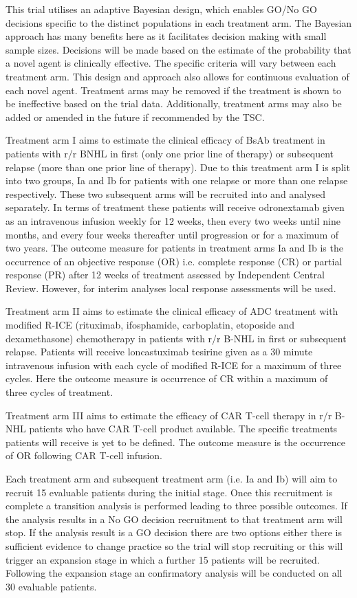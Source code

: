 This trial utilises an adaptive Bayesian design, which enables GO/No GO decisions specific to the distinct populations in each treatment arm. The Bayesian approach has many benefits here as it facilitates decision making with small sample sizes. Decisions will be made based on the estimate of the probability that a novel agent is clinically effective. The specific criteria will vary between each treatment arm. This design and approach also allows for continuous evaluation of each novel agent. Treatment arms may be removed if the treatment is shown to be ineffective based on the trial data. Additionally, treatment arms may also be added or amended in the future if recommended by the TSC. 

Treatment arm \RN{1} aims to estimate the clinical efficacy of BsAb treatment in patients with r/r BNHL in first (only one prior line of therapy) or subsequent relapse (more than one prior line of therapy). Due to this treatment arm \RN{1} is split into two groups, \RN{1}a and \RN{1}b for patients with one relapse or more than one relapse respectively. These two subsequent arms will be recruited into and analysed separately. In terms of treatment these patients will receive odronextamab given as an intravenous infusion weekly for 12 weeks, then every two weeks until nine months, and every four weeks thereafter until progression or for a maximum of two years. The outcome measure for patients in treatment arms \RN{1}a and \RN{1}b is the occurrence of an objective response (OR) i.e. complete response (CR) or partial response (PR) after 12 weeks of treatment assessed by Independent Central Review. However, for interim analyses local response assessments will be used. 

Treatment arm \RN{2} aims to estimate the clinical efficacy of ADC treatment with modified R-ICE (rituximab, ifosphamide, carboplatin, etoposide and dexamethasone) chemotherapy in patients with r/r B-NHL in first or subsequent relapse. Patients will receive loncastuximab tesirine given as a 30 minute intravenous infusion with each cycle of modified R-ICE for a maximum of three cycles. Here the outcome measure is occurrence of CR within a maximum of three cycles of treatment. 

Treatment arm \RN{3} aims to estimate the efficacy of CAR T-cell therapy in r/r B-NHL patients who have CAR T-cell product available. The specific treatments patients will receive is yet to be defined. The outcome measure is the occurrence of OR following CAR T-cell infusion. 

Each treatment arm and subsequent treatment arm (i.e. \RN{1}a and \RN{1}b) will aim to recruit 15 evaluable patients during the initial stage. Once this recruitment is complete a transition analysis is performed leading to three possible outcomes. If the analysis results in a No GO decision recruitment to that treatment arm will stop. If the analysis result is a GO decision there are two options either there is sufficient evidence to change practice so the trial will stop recruiting or this will trigger an expansion stage in which a further 15 patients will be recruited. Following the expansion stage an confirmatory analysis will be conducted on all 30 evaluable patients. 

